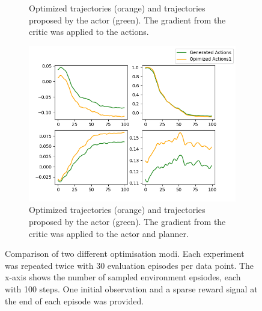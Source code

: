 \begin{figure}[htbp]
\begin{subfigure}[t]{0.45\textwidth}
      \caption{Optimized trajectories (orange) and trajectories proposed by the actor (green). The gradient from the critic was applied to the actions.}
      \label{fig:plot2}
    \end{subfigure}
    \hfill
    \begin{subfigure}[t]{0.45\textwidth}
      \includegraphics[width=\textwidth]{images/Plan_vs_Actions/changes/plans_actor_0.png}
      \caption{Optimized trajectories (orange) and trajectories proposed by the actor (green). The gradient from the critic was applied to the actor and planner.}
      \label{fig:plot4}
    \end{subfigure}
    \caption{Comparison of two different optimisation modi. Each experiment was repeated twice with 30 evaluation episodes per data point.
    The x-axis shows the number of sampled environment epsiodes, each with 100 steps. One initial observation and a sparse reward signal at the end of each episode was provided.}
    \label{fig:fourplots}
\end{figure}

